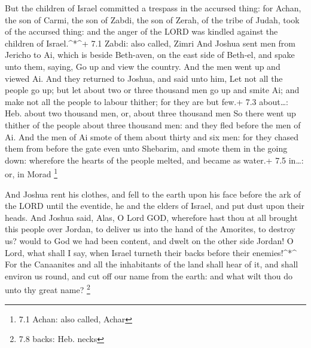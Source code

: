 But the children of Israel committed a trespass in the
accursed thing: for Achan, the son of Carmi, the son of Zabdi, the son
of Zerah, of the tribe of Judah, took of the accursed thing: and the
anger of the LORD was kindled against the children of Israel.\^{}*\^{}+
7.1 Zabdi: also called, Zimri  And Joshua sent men from
Jericho to Ai, which is beside Beth-aven, on the east side of Beth-el,
and spake unto them, saying, Go up and view the country. And the men
went up and viewed Ai.  And they returned to Joshua, and
said unto him, Let not all the people go up; but let about two or three
thousand men go up and smite Ai; and make not all the people to labour
thither; for they are but few.+ 7.3 about\ldots: Heb. about two thousand
men, or, about three thousand men  So there went up thither
of the people about three thousand men: and they fled before the men of
Ai.  And the men of Ai smote of them about thirty and six
men: for they chased them from before the gate even unto Shebarim, and
smote them in the going down: wherefore the hearts of the people melted,
and became as water.+ 7.5 in\ldots: or, in Morad \footnote{7.1 Achan:
  also called, Achar}

 And Joshua rent his clothes, and fell to the earth upon his
face before the ark of the LORD until the eventide, he and the elders of
Israel, and put dust upon their heads.  And Joshua said,
Alas, O Lord GOD, wherefore hast thou at all brought this people over
Jordan, to deliver us into the hand of the Amorites, to destroy us?
would to God we had been content, and dwelt on the other side Jordan!
 O Lord, what shall I say, when Israel turneth their backs
before their enemies!\^{}*\^{}  For the Canaanites and all
the inhabitants of the land shall hear of it, and shall environ us
round, and cut off our name from the earth: and what wilt thou do unto
thy great name? \footnote{7.8 backs: Heb. necks}

